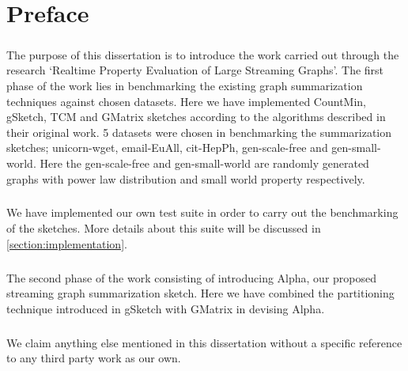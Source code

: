 \chapter*{Preface}

\paragraph{}
The purpose of this dissertation is to introduce the work carried out through the research ‘Realtime Property Evaluation of Large Streaming Graphs’. The first phase of the work lies in benchmarking the existing graph summarization techniques against chosen datasets. Here we have implemented CountMin\cite{cormode_improved_2003}, gSketch\cite{zhao_gsketch:_2011}, TCM\cite{tang_graph_2016} and GMatrix\cite{khan_query-friendly_2016} sketches according to the algorithms described in their original work. 5 datasets were chosen in benchmarking the summarization sketches; unicorn-wget\cite{DVN/5H4TDI_2018}, email-EuAll\cite{leskovec_graph_2007}, cit-HepPh\cite{leskovec_graphs_2005, gehrke_overview_2003}, gen-scale-free and gen-small-world. Here the gen-scale-free and gen-small-world are randomly generated graphs with power law distribution and small world property respectively. 

\paragraph{}
We have implemented our own test suite in order to carry out the benchmarking of the sketches. More details about this suite will be discussed in \autoref{section:implementation}.

\paragraph{}
The second phase of the work consisting of introducing Alpha, our proposed streaming graph summarization sketch. Here we have combined the partitioning technique introduced in gSketch with GMatrix in devising Alpha. 

\paragraph{}
We claim anything else mentioned in this dissertation without a specific reference to any third party work as our own. 